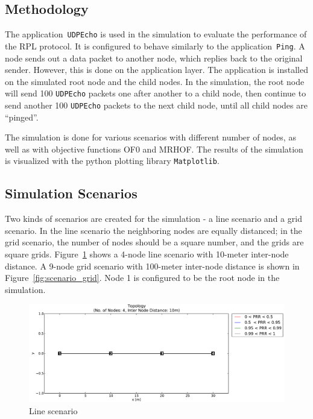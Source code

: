 \subsection{Methodology}
\label{Sim:Method}
The application~\texttt{UDPEcho} is used in the simulation to evaluate the performance of the RPL protocol. It is configured to behave similarly to the application~\texttt{Ping}. A node sends out a data packet to another node, which replies back to the original sender. However, this is done on the application layer. The application is installed on the simulated root node and the child nodes. In the simulation, the root node will send 100 \texttt{UDPEcho} packets one after another to a child node, then continue to send another 100 \texttt{UDPEcho} packets to the next child node, until all child nodes are  ``pinged''.     

The simulation is done for various scenarios with different number of nodes, as well as with objective functions OF0 and MRHOF. The results of the simulation is visualized with the python plotting library \texttt{Matplotlib}.

\subsection{Simulation Scenarios}
\label{Sim:Scenarios}

Two kinds of scenarios are created for the simulation - a line scenario and a grid scenario. In the line scenario the neighboring nodes are equally distanced; in the grid scenario, the number of nodes should be a square number, and the grids are square grids. Figure~\ref{fig:scenario_line} shows a 4-node line scenario with 10-meter inter-node distance. A 9-node grid scenario with 100-meter inter-node distance is shown in Figure~\ref{fig:scenario_grid}. Node 1 is configured to be the root node in the simulation.

\begin{figure}[htpb]
 	\centering
    \leavevmode
      \includegraphics[scale=0.35]{Pics/results/topo4_dist10_line.pdf}
    \caption{Line scenario}
    \label{fig:scenario_line}
\end{figure}

